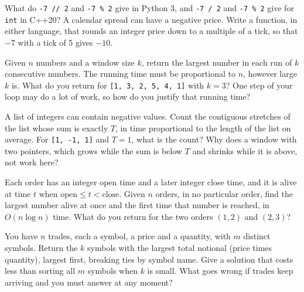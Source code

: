 \begin{question}\label{iq:iv3:algorithms:16}
What do \texttt{-7 // 2} and \texttt{-7 \% 2} give in Python 3, and \texttt{-7 / 2} and \texttt{-7 \% 2} give for \texttt{int} in C++20? A calendar spread can have a negative price. Write a function, in either language, that rounds an integer price down to a multiple of a tick, so that $-7$ with a tick of 5 gives $-10$.
\end{question}

\begin{question}\label{iq:iv3:algorithms:17}
Given $n$ numbers and a window size $k$, return the largest number in each run of $k$ consecutive numbers. The running time must be proportional to $n$, however large $k$ is. What do you return for \texttt{[1, 3, 2, 5, 4, 1]} with $k = 3$? One step of your loop may do a lot of work, so how do you justify that running time?
\end{question}

\begin{question}\label{iq:iv3:algorithms:18}
A list of integers can contain negative values. Count the contiguous stretches of the list whose sum is exactly $T$, in time proportional to the length of the list on average. For \texttt{[1, -1, 1]} and $T = 1$, what is the count? Why does a window with two pointers, which grows while the sum is below $T$ and shrinks while it is above, not work here?
\end{question}

\begin{question}\label{iq:iv3:algorithms:19}
Each order has an integer open time and a later integer close time, and it is alive at time $t$ when $\text{open} \le t < \text{close}$. Given $n$ orders, in no particular order, find the largest number alive at once and the first time that number is reached, in $O(n \log n)$ time. What do you return for the two orders $(1, 2)$ and $(2, 3)$?
\end{question}

\begin{question}\label{iq:iv3:algorithms:20}
You have $n$ trades, each a symbol, a price and a quantity, with $m$ distinct symbols. Return the $k$ symbols with the largest total notional (price times quantity), largest first, breaking ties by symbol name. Give a solution that costs less than sorting all $m$ symbols when $k$ is small. What goes wrong if trades keep arriving and you must answer at any moment?
\end{question}

